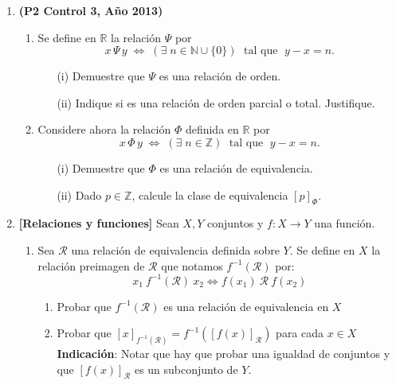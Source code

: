 \documentclass[10pt]{article}
\newcommand{\R}{\mathbb R}
\newcommand{\N}{\mathbb N}
\newcommand{\Z}{\mathbb Z}
\theoremstyle{plain}
\theoremstyle{definition}
\begin{document}
\begin{enumerate}[label=\textbf{P\arabic*.-}]
\item \textbf{(P2 Control 3, Año 2013)}
\begin{enumerate}
\item Se define en $\R$ la relación $\Psi$ por
$$x\,\Psi\,y \; \Leftrightarrow \; (\exists \; n\in \N\cup\{0\})\; \mbox{ tal que } \; y-x=n.$$
\begin{enumerate}
\item[(i)] Demuestre que $\Psi$ es una relación de orden.
\item[(ii)] Indique si es una relación de orden parcial o total. Justifique.
\end{enumerate}
\item Considere ahora la relación $\Phi$ definida en $\R$ por
$$x\,\Phi\,y \; \Leftrightarrow \; (\exists \; n\in\Z) \; \mbox{ tal que } \; y-x=n.$$
\begin{enumerate}
\item[(i)] Demuestre que $\Phi$ es una relación de equivalencia.
\item[(ii)] Dado $p\in\Z$, calcule la clase de equivalencia $[p]_{\Phi}$.
\end{enumerate}
\end{enumerate}

    \item \textbf{[Relaciones y funciones]} Sean $X,Y$ conjuntos y $f:X \to Y$ una función.
        \begin{enumerate}
            \item Sea $\mathcal{R}$ una relación de equivalencia definida sobre $Y$. Se define en $X$ la relación preimagen de $\mathcal{R}$ que notamos $f^{-1}(\mathcal{R})$ por:
                    $$ x_{1}~ f^{-1}(\mathcal{R})~ x_{2} \iff f(x_1) ~ \mathcal{R} ~ f(x_2) $$
                \begin{enumerate}
                    \item Probar que $f^{-1}(\mathcal{R})$ es una relación de equivalencia en $X$
                    \item Probar que $[x]_{f^{-1}(\mathcal{R})}=f^{-1}([f(x)]_{\mathcal{R}})$ para cada $x \in X$\\
                    \textbf{Indicación}: Notar que hay que probar una igualdad de conjuntos y que $[f(x)]_{\mathcal{R}}$ es un subconjunto de $Y$.
                \end{enumerate}
            

\end{enumerate}
\end{enumerate}
\end{document}
